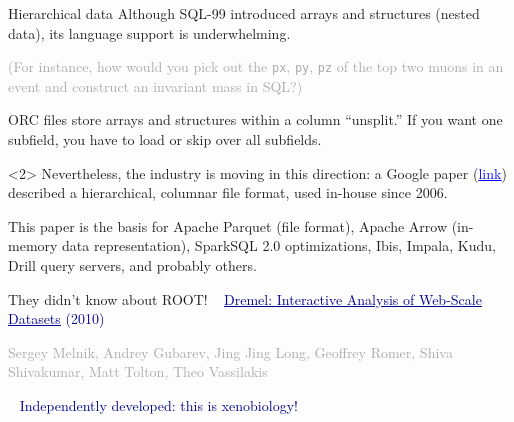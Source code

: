 \documentclass{beamer}
\begin{document}
\begin{frame}{Hierarchical data}
\vspace{0.5 cm}
Although SQL-99 introduced arrays and structures (nested data), its language support is underwhelming.

\vspace{0.3 cm}
\textcolor{darkgray}{(For instance, how would you pick out the {\tt px}, {\tt py}, {\tt pz} of the top two muons in an event and construct an invariant mass in SQL?)}

\vspace{0.3 cm}
ORC files store arrays and structures within a column ``unsplit.'' If you want one subfield, you have to load or skip over all subfields.

\begin{uncoverenv}<2>
\vspace{0.5 cm}
Nevertheless, the industry is moving in this direction: a Google paper (\href{https://research.google.com/pubs/pub36632.html}{\textcolor{blue}{\underline{link}}}) described a hierarchical, columnar file format, used in-house since 2006.

\vspace{0.3 cm}
This paper is the basis for Apache Parquet (file format), Apache Arrow (in-memory data representation), SparkSQL 2.0 optimizations, Ibis, Impala, Kudu, Drill query servers, and probably others.
\end{uncoverenv}
\end{frame}

\begin{frame}{They didn't know about ROOT!}
\vspace{0.5 cm}
\mbox{ } \hfill \textcolor{darkblue}{\large \underline{Dremel: Interactive Analysis of Web-Scale Datasets} (2010)} \hfill \mbox{ }

\vspace{0.2 cm}
\small
\textcolor{darkgray}{Sergey Melnik, Andrey Gubarev, Jing Jing Long, Geoffrey Romer, Shiva Shivakumar, Matt Tolton, Theo Vassilakis}

\vspace{0.5 cm}

\vspace{0.5 cm}
\mbox{ } \hfill \textcolor{darkblue}{\Large Independently developed: this is xenobiology!} \hfill \mbox{ }
\end{frame}
\end{document}
